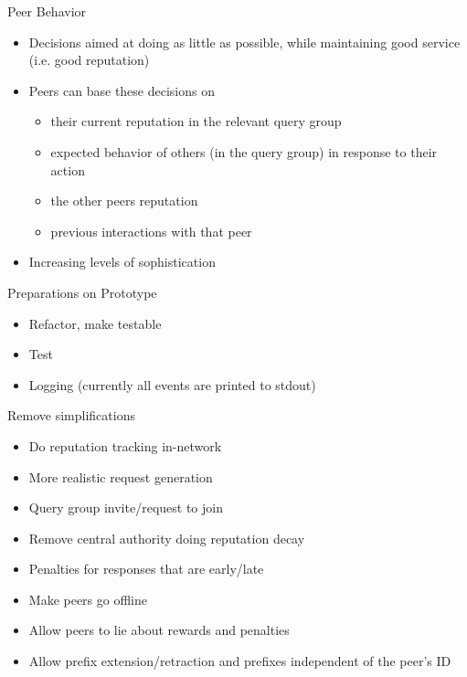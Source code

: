 \documentclass[presentation,english,usenames,dvipsnames]{beamer}
\begin{document}
\begin{frame}{Peer Behavior}
  \begin{itemize}
    \item Decisions aimed at doing as little as possible, while maintaining good
          service (i.e. good reputation)
    \item Peers can base these decisions on
    \begin{itemize}
      \item their current reputation in the relevant query group
      \item expected behavior of others (in the query group) in response to
            their action
      \item the other peers reputation
      \item previous interactions with that peer
    \end{itemize}
    \item Increasing levels of sophistication
  \end{itemize}
\end{frame}

\begin{frame}{Preparations on Prototype}
  \begin{itemize}
    \item Refactor, make testable
    \item Test
    \item Logging (currently all events are printed to stdout)
  \end{itemize}
\end{frame}

\begin{frame}{Remove simplifications}
  \begin{itemize}
    \item Do reputation tracking in-network
    \item More realistic request generation
    \item Query group invite/request to join
    \item Remove central authority doing reputation decay
    \item Penalties for responses that are early/late
    \item Make peers go offline
    \item Allow peers to lie about rewards and penalties
    \item Allow prefix extension/retraction and prefixes independent of the
          peer's ID
  \end{itemize}
\end{frame}
\end{document}
